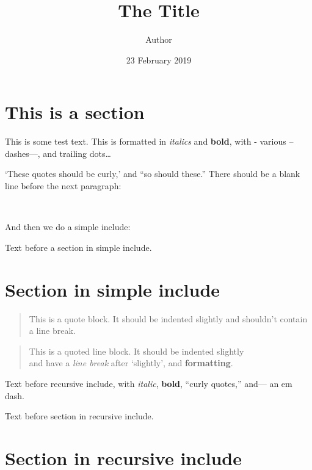 \documentclass[
  12pt,
  british,
  a4paper,
]{article}
\title{The Title}
\author{Author}
\date{23 February 2019}
\begin{document}
\maketitle

\frenchspacing

{
\hypersetup{linkcolor=}
\setcounter{tocdepth}{1}
\tableofcontents
}

\hypertarget{this-is-a-section}{%
\section{This is a section}\label{this-is-a-section}}

This is some test text. This is formatted in \emph{italics} and
\textbf{bold}, with - various -- dashes---, and trailing dots\ldots{}

`These quotes should be curly,' and ``so should these.'' There should be
a blank line before the next paragraph:

~

And then we do a simple include:

Text before a section in simple include.

\hypertarget{section-in-simple-include}{%
\section{Section in simple include}\label{section-in-simple-include}}

\begin{quote}
This is a quote block. It should be indented slightly and shouldn't
contain a line break.
\end{quote}

\begin{quote}
This is a quoted line block. It should be indented slightly\\
and have a \emph{line break} after `slightly', and \textbf{formatting}.
\end{quote}

Text before recursive include, with \emph{italic}, \textbf{bold},
``curly quotes,'' and--- an em dash.

Text before section in recursive include.

\hypertarget{section-in-recursive-include}{%
\section{Section in recursive
include}\label{section-in-recursive-include}}
\end{document}
